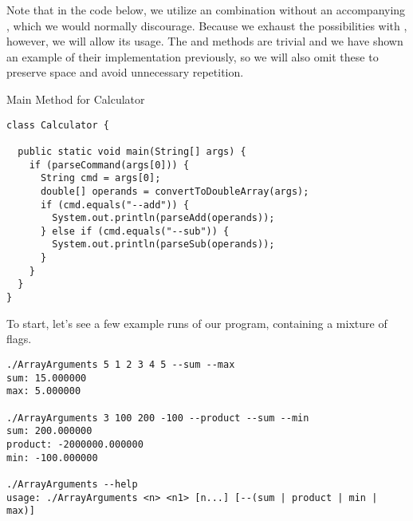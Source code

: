 Note that in the code below, we utilize an  combination without an accompanying , which we would normally discourage. Because we exhaust the possibilities with , however, we will allow its usage. The  and  methods are trivial and we have shown an example of their implementation previously, so we will also omit these to preserve space and avoid unnecessary repetition.

\begin{cl}{Main Method for Calculator}
\begin{lstlisting}[language=MyJava]
class Calculator {

  public static void main(String[] args) {
    if (parseCommand(args[0])) {
      String cmd = args[0];
      double[] operands = convertToDoubleArray(args);
      if (cmd.equals("--add")) {
        System.out.println(parseAdd(operands));
      } else if (cmd.equals("--sub")) {
        System.out.println(parseSub(operands));
      }
    }
  }
}
\end{lstlisting}
\end{cl}


To start, let's see a few example runs of our program, containing a mixture of flags.

\par{
\begin{verbatim}
./ArrayArguments 5 1 2 3 4 5 --sum --max
sum: 15.000000
max: 5.000000

./ArrayArguments 3 100 200 -100 --product --sum --min
sum: 200.000000
product: -2000000.000000
min: -100.000000

./ArrayArguments --help
usage: ./ArrayArguments <n> <n1> [n...] [--(sum | product | min | max)]
\end{verbatim}
}

